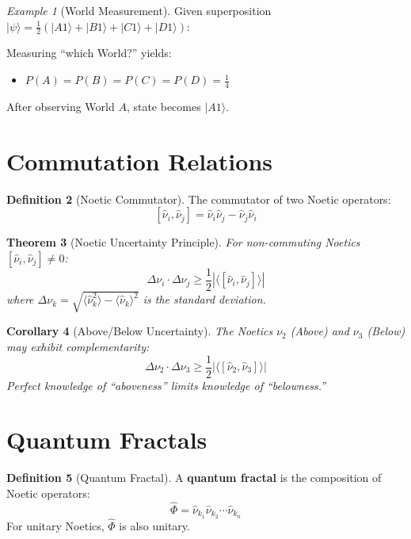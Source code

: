 \documentclass[11pt,twoside,openright]{book}
\theoremstyle{definition}
\newtheorem{definition}{Definition}[chapter]
\theoremstyle{plain}
\newtheorem{theorem}[definition]{Theorem}
\newtheorem{corollary}[definition]{Corollary}
\theoremstyle{remark}
\newtheorem{example}[definition]{Example}
\newcommand{\noe}[1]{\nu_{#1}}
\newcommand{\Frac}{\Phi}
\newcommand{\qket}[1]{|#1\rangle}
\newcommand{\qop}[1]{\hat{#1}}
\begin{document}
\begin{example}[World Measurement]
\label{ex:world-measurement}
Given superposition $\qket{\psi} = \frac{1}{2}(\qket{A1} + \qket{B1} + \qket{C1} + \qket{D1})$:

Measuring ``which World?'' yields:
\begin{itemize}
  \item $P(A) = P(B) = P(C) = P(D) = \frac{1}{4}$
\end{itemize}

After observing World $A$, state becomes $\qket{A1}$.
\end{example}

\section{Commutation Relations}

\begin{definition}[Noetic Commutator]
\label{def:noetic-commutator}
The commutator of two Noetic operators:
\[
[\qop{\nu}_i, \qop{\nu}_j] = \qop{\nu}_i \qop{\nu}_j - \qop{\nu}_j \qop{\nu}_i
\]
\end{definition}

\begin{theorem}[Noetic Uncertainty Principle]
\label{thm:noetic-uncertainty}
For non-commuting Noetics $[\qop{\nu}_i, \qop{\nu}_j] \neq 0$:
\[
\Delta \nu_i \cdot \Delta \nu_j \geq \frac{1}{2} |\langle [\qop{\nu}_i, \qop{\nu}_j] \rangle|
\]
where $\Delta \nu_k = \sqrt{\langle \qop{\nu}_k^2 \rangle - \langle \qop{\nu}_k \rangle^2}$ is the standard deviation.
\end{theorem}

\begin{corollary}[Above/Below Uncertainty]
\label{cor:above-below}
The Noetics $\noe{2}$ (Above) and $\noe{3}$ (Below) may exhibit complementarity:
\[
\Delta \nu_2 \cdot \Delta \nu_3 \geq \frac{1}{2} |\langle [\qop{\nu}_2, \qop{\nu}_3] \rangle|
\]
Perfect knowledge of ``aboveness'' limits knowledge of ``belowness.''
\end{corollary}

\section{Quantum Fractals}

\begin{definition}[Quantum Fractal]
\label{def:quantum-fractal}
A \textbf{quantum fractal} is the composition of Noetic operators:
\[
\qop{\Frac} = \qop{\nu}_{k_1} \qop{\nu}_{k_2} \cdots \qop{\nu}_{k_n}
\]
For unitary Noetics, $\qop{\Frac}$ is also unitary.
\end{definition}
\end{document}
